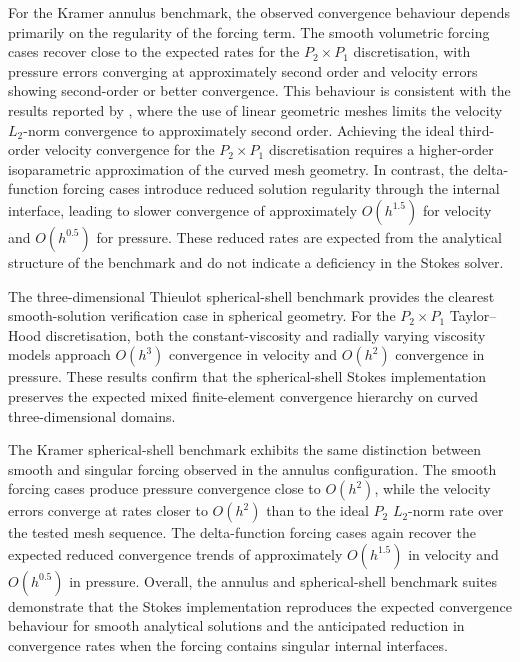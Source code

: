 For the Kramer annulus benchmark, the observed convergence behaviour depends
primarily on the regularity of the forcing term. The smooth volumetric forcing
cases recover close to the expected rates for the \(P_2\times P_1\)
discretisation, with pressure errors converging at approximately second order
and velocity errors showing second-order or better convergence. This behaviour
is consistent with the results reported by \citet{kramer2021}, where the use of
linear geometric meshes limits the velocity \(L_2\)-norm convergence to approximately
second order. Achieving the ideal third-order velocity convergence for the \(P_2\times P_1\)
discretisation requires a higher-order isoparametric approximation of the curved mesh
geometry. In contrast, the delta-function forcing cases introduce reduced solution regularity
through the internal interface, leading to slower convergence of approximately
\(O(h^{1.5})\) for velocity and \(O(h^{0.5})\) for pressure. These reduced
rates are expected from the analytical structure of the benchmark and do not
indicate a deficiency in the Stokes solver.

The three-dimensional Thieulot spherical-shell benchmark provides the clearest
smooth-solution verification case in spherical geometry. For the
\(P_2\times P_1\) Taylor--Hood discretisation, both the constant-viscosity and
radially varying viscosity models approach \(O(h^3)\) convergence in velocity
and \(O(h^2)\) convergence in pressure. These results confirm that the
spherical-shell Stokes implementation preserves the expected mixed
finite-element convergence hierarchy on curved three-dimensional domains.

The Kramer spherical-shell benchmark exhibits the same distinction between
smooth and singular forcing observed in the annulus configuration. The smooth
forcing cases produce pressure convergence close to \(O(h^2)\), while the
velocity errors converge at rates closer to \(O(h^2)\) than to the ideal
\(P_2\) \(L_2\)-norm rate over the tested mesh sequence. The delta-function
forcing cases again recover the expected reduced convergence trends of
approximately \(O(h^{1.5})\) in velocity and \(O(h^{0.5})\) in pressure.
Overall, the annulus and spherical-shell benchmark suites demonstrate that the
Stokes implementation reproduces the expected convergence behaviour for smooth
analytical solutions and the anticipated reduction in convergence rates when
the forcing contains singular internal interfaces.

